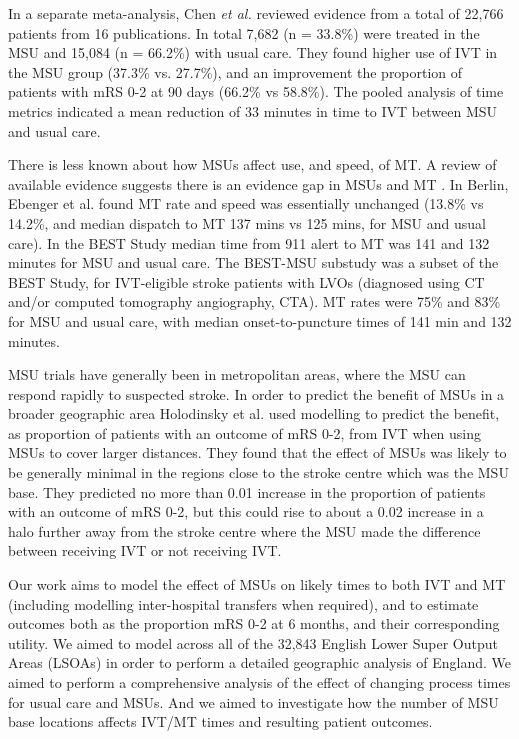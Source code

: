 In a separate meta-analysis, Chen \textit{et al.} \cite{chen_systematic_2022} reviewed evidence from a total of 22,766 patients from 16 publications. In total 7,682 (n = 33.8\%) were treated in the MSU and 15,084 (n = 66.2\%) with usual care. They found higher use of IVT in the MSU group (37.3\% vs. 27.7\%), and an improvement the proportion of patients with mRS 0-2 at 90 days (66.2\% vs 58.8\%).  The pooled analysis of time metrics indicated a mean reduction of 33 minutes in time to IVT between MSU and usual care.

There is less known about how MSUs affect use, and speed, of MT. A review of available evidence suggests there is an evidence gap in MSUs and MT \cite{navi_mobile_2022}. In Berlin, Ebenger et al. \cite{ebinger_association_2021} found MT rate and speed was essentially unchanged (13.8\% vs 14.2\%, and median dispatch to MT 137 mins vs 125 mins, for MSU and usual care). In the BEST Study \cite{grotta_prospective_2021} median time from 911 alert to MT was 141 and 132 minutes for MSU and usual care. The BEST-MSU substudy \cite{czap_abstract_2022} was a subset of the BEST Study, for IVT-eligible stroke patients with LVOs (diagnosed using CT and/or computed tomography angiography, CTA). MT rates were 75\% and 83\% for MSU and usual care,  with median onset-to-puncture times of 141 min and 132 minutes.


MSU trials have generally been in metropolitan areas, where the MSU can respond rapidly to suspected stroke. In order to predict the benefit of MSUs in a broader geographic area Holodinsky et al. \cite{holodinsky_jessalyn_k_what_2020} used modelling to predict the benefit, as proportion of patients with an outcome of mRS 0-2, from IVT when using MSUs to cover larger distances. They found that the effect of MSUs was likely to be generally minimal in the regions close to the stroke centre which was the MSU base. They predicted no more than 0.01 increase in the proportion of patients with an outcome of mRS 0-2, but this could rise to about a 0.02 increase in a halo further away from the stroke centre where the MSU made the difference between receiving IVT or not receiving IVT.


Our work aims to model the effect of MSUs on likely times to both IVT and MT (including modelling inter-hospital transfers when required), and to estimate outcomes both as the proportion mRS 0-2 at 6 months, and their corresponding utility. We aimed to model across all of the 32,843 English Lower Super Output Areas (LSOAs) in order to perform a detailed geographic analysis of England. We aimed to perform a comprehensive analysis of the effect of changing process times for usual care and MSUs. And we aimed to investigate how the number of MSU base locations affects IVT/MT times and resulting patient outcomes.